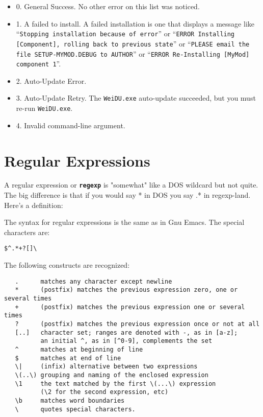 \documentclass{article}
\def\ttref#1{\ahrefloc{#1}{\tt #1}}
\def\DEFINE#1{{\tt \bf #1}\label{#1}\index{#1}}
\def\t#1{{\tt #1}}
\begin{document}
\begin{itemize}
\item 0. General Success. No other error on this list was noticed.
\item 1. A \ttref{TP2} \ttref{Component} failed to install.
    A failed installation is one that displays a message like
    ``\t{Stopping installation because of error}'' or
    ``\t{ERROR Installing [Component], rolling back to previous state}'' or
    ``\t{PLEASE email the file SETUP-MYMOD.DEBUG to AUTHOR}'' or
    ``\t{ERROR Re-Installing [MyMod] component 1}''.
\item 2. Auto-Update Error.
\item 3. Auto-Update Retry. The \t{WeiDU.exe} auto-update succeeded, but
you must re-run \t{WeiDU.exe}.
\item 4. Invalid command-line argument.
\end{itemize}

\section{Regular Expressions}

A regular expression or \DEFINE{regexp} is "somewhat" like a DOS wildcard
but not quite. The big difference is that if you would say * in DOS you say
.* in regexp-land.  Here's a definition:

The syntax for regular expressions is the same as in Gnu Emacs. The special
characters are:
\begin{verbatim}
$^.*+?[]\
\end{verbatim}

The following constructs are recognized:
\begin{verbatim}
   .      matches any character except newline
   *      (postfix) matches the previous expression zero, one or several times
   +      (postfix) matches the previous expression one or several times
   ?      (postfix) matches the previous expression once or not at all
   [..]   character set; ranges are denoted with -, as in [a-z];
          an initial ^, as in [^0-9], complements the set
   ^      matches at beginning of line
   $      matches at end of line
   \|     (infix) alternative between two expressions
   \(..\) grouping and naming of the enclosed expression
   \1     the text matched by the first \(...\) expression
          (\2 for the second expression, etc)
   \b     matches word boundaries
   \      quotes special characters.
\end{verbatim}
\end{document}
